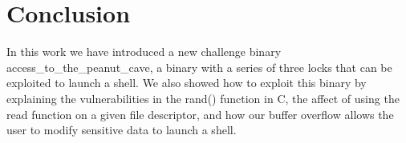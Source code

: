 \section{Conclusion}
In this work we have introduced a new challenge binary access\_to\_the\_peanut\_cave, a binary with a series of three locks that can be exploited to launch a shell. We also showed how to exploit this binary by explaining the vulnerabilities in the rand() function in C, the affect of using the read function on a given file descriptor, and how our buffer overflow allows the user to modify sensitive data to launch a shell. 
